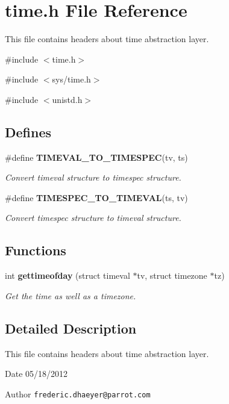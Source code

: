 \section{time.h File Reference}
\label{time_8h}


This file contains headers about time abstraction layer.  


{\ttfamily \#include $<$time.h$>$}\par
{\ttfamily \#include $<$sys/time.h$>$}\par
{\ttfamily \#include $<$unistd.h$>$}\par
\subsection*{Defines}
\begin{DoxyCompactItemize}
\item 
\#define {\bf TIMEVAL\_\-TO\_\-TIMESPEC}(tv, ts)
\begin{DoxyCompactList}\small\item\em Convert timeval structure to timespec structure. \end{DoxyCompactList}\item 
\#define {\bf TIMESPEC\_\-TO\_\-TIMEVAL}(ts, tv)
\begin{DoxyCompactList}\small\item\em Convert timespec structure to timeval structure. \end{DoxyCompactList}\end{DoxyCompactItemize}
\subsection*{Functions}
\begin{DoxyCompactItemize}
\item 
int {\bf gettimeofday} (struct timeval $\ast$tv, struct timezone $\ast$tz)
\begin{DoxyCompactList}\small\item\em Get the time as well as a timezone. \end{DoxyCompactList}\end{DoxyCompactItemize}


\subsection{Detailed Description}
This file contains headers about time abstraction layer. \begin{DoxyDate}{Date}
05/18/2012 
\end{DoxyDate}
\begin{DoxyAuthor}{Author}
{\tt frederic.dhaeyer@parrot.com} 
\end{DoxyAuthor}


